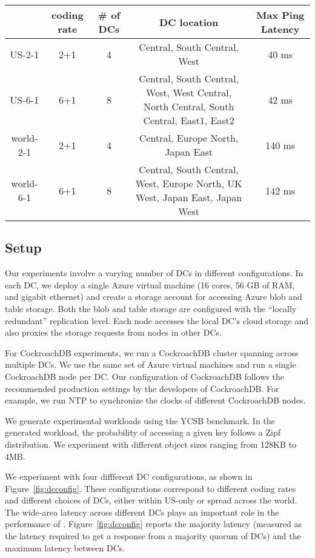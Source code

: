 \begin{figure*}
\begin{tabular}{c|c|c|c|c}
& coding rate & \# of DCs & DC location & Max Ping Latency\\
\hline
US-2-1 & 2+1 & 4 & Central, South Central, West & 40 ms\\
US-6-1 & 6+1 & 8 & Central, South Central, West, West Central, North Central, South Central, East1, East2& 42 ms\\ 
world-2-1 & 2+1 & 4 & Central, Europe North, Japan East & 140 ms\\
world-6-1 & 6+1 & 8 & Central, South Central, West, Europe North, UK West, Japan East, Japan West  & 142 ms\\
\end{tabular}
\caption{The DC configurations and inter-DC latencies in various experiments~\label{fig:dcconfig}} 
\end{figure*}

\subsection{Setup}
Our experiments involve a varying number of DCs in different configurations. In
each DC, we deploy a single Azure virtual machine (16 cores, 56 GB of RAM, and
gigabit ethernet) and create a storage account for accessing Azure blob and
table storage. Both the blob and table storage are configured with the
``locally redundant'' replication level.  Each \name node accesses the local
DC's cloud storage and also proxies the storage requests from \name nodes in
other DCs.  

For CockroachDB experiments, we run a CockroachDB cluster spanning across
multiple DCs.  We use the same set of Azure virtual machines and run a single
CockroachDB node per DC. Our configuration of CockroachDB follows the
recommended production settings by the developers of CockroachDB. For example,
we run NTP to synchronize the clocks of different CockroachDB nodes. 

We generate experimental workloads using the YCSB benchmark. In the generated
workload, the probability of accessing a given key follows a Zipf distribution.
We experiment with different object sizes ranging from 128KB to 4MB. 

We experiment with four diffferent DC configurations, as shown in
Figure~\ref{fig:dcconfig}.  These configurations correspond to different coding
rates and different choices of DCs, either within US-only or spread across the
world. The wide-area latency across different DCs plays an important role in 
the performance of \name.  Figure~\ref{fig:dcconfig} reports the majority
latency (measured as the latency required to get a response from a majority
quorum of DCs) and the maximum latency between DCs.

